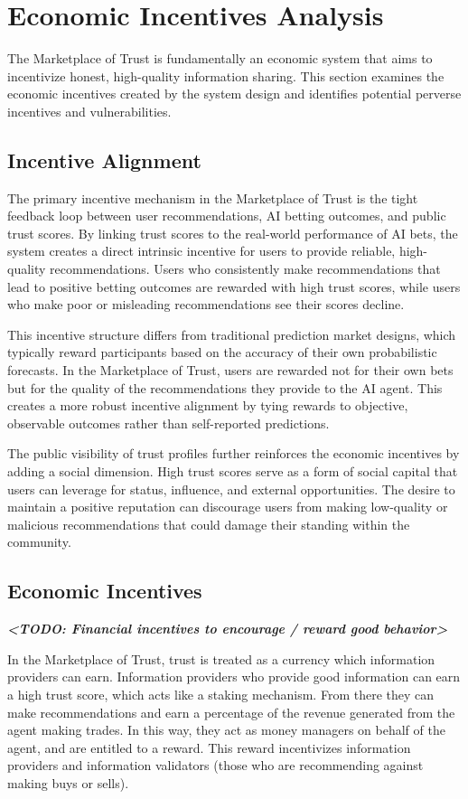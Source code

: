 \documentclass{article}
\begin{document}
\section{Economic Incentives Analysis}  

The Marketplace of Trust is fundamentally an economic system that aims to incentivize honest, high-quality information sharing. This section examines the economic incentives created by the system design and identifies potential perverse incentives and vulnerabilities.

\subsection{Incentive Alignment}
The primary incentive mechanism in the Marketplace of Trust is the tight feedback loop between user recommendations, AI betting outcomes, and public trust scores. By linking trust scores to the real-world performance of AI bets, the system creates a direct intrinsic incentive for users to provide reliable, high-quality recommendations. Users who consistently make recommendations that lead to positive betting outcomes are rewarded with high trust scores, while users who make poor or misleading recommendations see their scores decline.

This incentive structure differs from traditional prediction market designs, which typically reward participants based on the accuracy of their own probabilistic forecasts. In the Marketplace of Trust, users are rewarded not for their own bets but for the quality of the recommendations they provide to the AI agent. This creates a more robust incentive alignment by tying rewards to objective, observable outcomes rather than self-reported predictions.

The public visibility of trust profiles further reinforces the economic incentives by adding a social dimension. High trust scores serve as a form of social capital that users can leverage for status, influence, and external opportunities. The desire to maintain a positive reputation can discourage users from making low-quality or malicious recommendations that could damage their standing within the community. 

\subsection{Economic Incentives}
\textbf{\textit{<TODO: Financial incentives to encourage / reward good behavior>}}

In the Marketplace of Trust, trust is treated as a currency which information providers can earn. Information providers who provide good information can earn a high trust score, which acts like a staking mechanism. From there they can make recommendations and earn a percentage of the revenue generated from the agent making trades. In this way, they act as money managers on behalf of the agent, and are entitled to a reward. This reward incentivizes information providers and information validators (those who are recommending against making buys or sells).
\end{document}
